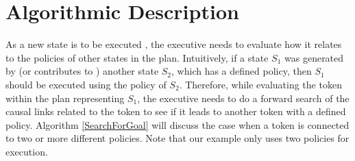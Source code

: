 %
%
%
%
%


\section{Algorithmic Description}
\label{sec:algo}

As a new state is to be executed , the executive needs to evaluate how it relates
to the policies of other states in the plan. Intuitively, if a state
$S_1$ was generated by (or contributes to ) another state $S_2$, which has a defined
policy, then $S_1$ should be executed using the policy of
$S_2$. Therefore, while evaluating the token within the plan
representing $S_1$, the executive needs to do a forward search of the
causal links related to the token to see if it leads to another token
with a defined policy. Algorithm \ref{SearchForGoal} will discuss the
case when a token is connected to two or more different policies. Note
that our example only uses two policies for execution.  %



